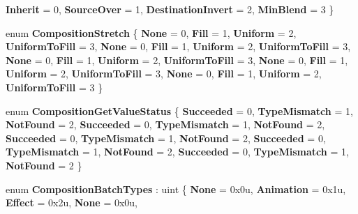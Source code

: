 \begin{DoxyCompactItemize}
\newline
{\bfseries Inherit} = 0, 
{\bfseries Source\+Over} = 1, 
{\bfseries Destination\+Invert} = 2, 
{\bfseries Min\+Blend} = 3
 \}
\item 
\mbox{\label{namespace_windows_1_1_u_i_1_1_composition_abe147aa23cb612204b73bb75dc3137e8}} 
enum {\bfseries Composition\+Stretch} \{ \newline
{\bfseries None} = 0, 
{\bfseries Fill} = 1, 
{\bfseries Uniform} = 2, 
{\bfseries Uniform\+To\+Fill} = 3, 
\newline
{\bfseries None} = 0, 
{\bfseries Fill} = 1, 
{\bfseries Uniform} = 2, 
{\bfseries Uniform\+To\+Fill} = 3, 
\newline
{\bfseries None} = 0, 
{\bfseries Fill} = 1, 
{\bfseries Uniform} = 2, 
{\bfseries Uniform\+To\+Fill} = 3, 
\newline
{\bfseries None} = 0, 
{\bfseries Fill} = 1, 
{\bfseries Uniform} = 2, 
{\bfseries Uniform\+To\+Fill} = 3, 
\newline
{\bfseries None} = 0, 
{\bfseries Fill} = 1, 
{\bfseries Uniform} = 2, 
{\bfseries Uniform\+To\+Fill} = 3
 \}
\item 
\mbox{\label{namespace_windows_1_1_u_i_1_1_composition_a9ddfa4d3a911ddf582cee8e20b4e8748}} 
enum {\bfseries Composition\+Get\+Value\+Status} \{ \newline
{\bfseries Succeeded} = 0, 
{\bfseries Type\+Mismatch} = 1, 
{\bfseries Not\+Found} = 2, 
{\bfseries Succeeded} = 0, 
\newline
{\bfseries Type\+Mismatch} = 1, 
{\bfseries Not\+Found} = 2, 
{\bfseries Succeeded} = 0, 
{\bfseries Type\+Mismatch} = 1, 
\newline
{\bfseries Not\+Found} = 2, 
{\bfseries Succeeded} = 0, 
{\bfseries Type\+Mismatch} = 1, 
{\bfseries Not\+Found} = 2, 
\newline
{\bfseries Succeeded} = 0, 
{\bfseries Type\+Mismatch} = 1, 
{\bfseries Not\+Found} = 2
 \}
\item 
\mbox{\label{namespace_windows_1_1_u_i_1_1_composition_aee18d765e5fb2f69e4c1656c628cd576}} 
enum {\bfseries Composition\+Batch\+Types} \+: uint \{ \newline
{\bfseries None} = 0x0u, 
{\bfseries Animation} = 0x1u, 
{\bfseries Effect} = 0x2u, 
{\bfseries None} = 0x0u, 

\end{DoxyCompactItemize}
